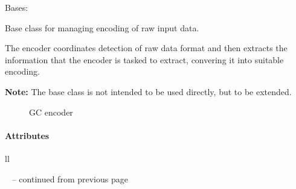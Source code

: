 \documentclass[letterpaper,10pt,english]{sphinxmanual}
\begin{document}
\begin{fulllineitems}
\label{fseq.reading:fseq.reading.seq_encoder.SeqEncoder}
Bases: 

Base class for managing encoding of raw input data.

The encoder coordinates detection of raw data format and then
extracts the information that the encoder is tasked to extract, 
convering it into suitable encoding.

\textbf{Note:} The base class is not intended to be used directly, but
to be extended.



\begin{description}
\item[{{\hyperref[fseq.reading:fseq.reading.seq_encoder.SeqEncoderGC]{}}}] \leavevmode
GC encoder

\end{description}


\paragraph{Attributes}

\begin{longtable}{ll}
\hline
\endfirsthead

%
{{\textsf{\tablename\ \thetable{} -- continued from previous page}}} \\
\hline
\endhead

\hline {} \\ \hline
\endfoot

\endlastfoot



\end{longtable}
\end{fulllineitems}
\end{document}
